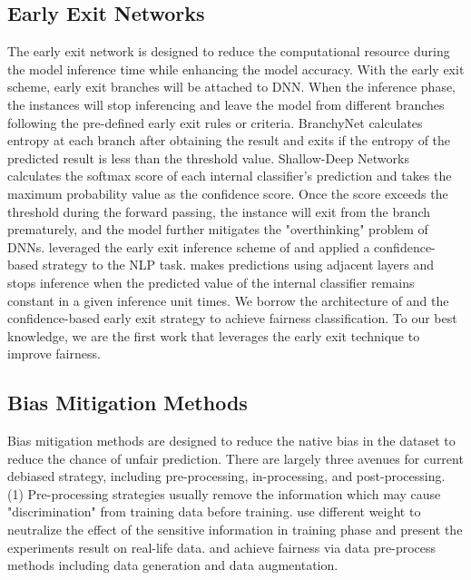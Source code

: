 \subsection{Early Exit Networks} %
The early exit network is designed to reduce the computational resource during the model inference time while enhancing the model accuracy. With the early exit scheme, early exit branches will be attached to DNN. When the inference phase, the instances will stop inferencing and leave the model from different branches following the pre-defined early exit rules or criteria. BranchyNet \cite{Teerapittayanon2016BranchyNetFI}  calculates entropy at each branch after obtaining the result and exits if the entropy of the predicted result is less than the threshold value. Shallow-Deep Networks \cite{Kaya2019ShallowDeepNU} calculates the softmax score of each internal classifier's prediction and takes the maximum probability value as the confidence score. Once the score exceeds the threshold during the forward passing, the instance will exit from the branch prematurely, and the model further mitigates the "overthinking" problem of DNNs. \cite{schwartz-etal-2020-right} leveraged the early exit inference scheme of \cite{Kaya2019ShallowDeepNU} and applied a confidence-based strategy to the NLP task. \cite{Zhou2020BERTLP} makes predictions using adjacent layers and stops inference when the predicted value of the internal classifier remains constant in a given inference unit times. We borrow the architecture of \cite{Kaya2019ShallowDeepNU} and the confidence-based early exit strategy to achieve fairness classification. To our best knowledge, we are the first work that leverages the early exit technique to improve fairness.


\subsection{Bias Mitigation Methods}
Bias mitigation methods are designed to reduce the native bias in the dataset to reduce the chance of unfair prediction. There are largely three avenues for current debiased strategy, including pre-processing, in-processing, and post-processing. 
(1) Pre-processing strategies usually remove the information which may cause "discrimination" from training data before training. \cite{Kamiran2011DataPT} use different weight to neutralize the effect of the sensitive information in training phase and present the experiments result on real-life data. \cite{Ngxande2020BiasRI} and \cite{Lu2020GenderBI} achieve fairness via data pre-process methods including data generation and data augmentation.

